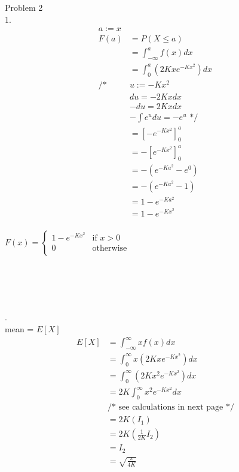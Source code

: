 \documentclass[12pt,border=4pt,multi]{article}%
\begin{document}
\\
\\
\\
\\
\newpage 
\noindent
Problem 2\\
1. 
\begin{align*}
a := x\\
F(a) &= P(X \leq a)\\
&= \int_{-\infty}^{a} f(x) dx\\
&= \int_{0}^{a} \left(2Kxe^{-Kx^2}\right) dx\\ 
\text{/* } &u := -Kx^2\\
&du = -2Kxdx\\
&-du = 2Kxdx\\ 
&-\int e^u du = -e^u \text{ */}\\
&= \left[-e^{-Kx^2}\right]_0^a\\
&= -\left[e^{-Kx^2}\right]_0^a\\
&= -\left(e^{-Ka^2} - e^0\right)\\
&= -\left(e^{-Ka^2} - 1\right)\\
&= 1 - e^{-Ka^2}\\
&=  1 - e^{-Kx^2}\\
\end{align*}
\begin{center}
$ \boxed{F(x) =
\begin{cases}
1 - e^{-Kx^2} & \text{if } x > 0\\
0 & \text{otherwise}\\
\end{cases}}$
\end{center}
\\
\\
\\
\\
\newpage
{}.\\
mean = $E[X]$
\begin{align*}
E[X] &= \int_{-\infty}^{\infty} x f(x) dx\\
&=  \int_{0}^{\infty} x \left(2Kxe^{-Kx^2}\right) dx\\
&=  \int_{0}^{\infty} \left(2Kx^2e^{-Kx^2}\right) dx\\
&=  2K\int_{0}^{\infty} x^2e^{-Kx^2} dx\\
&\text{/* see calculations in next page */}\\
&= 2K(I_1)\\
&= 2K\left(\frac{1}{2K}I_2\right)\\
&= I_2\\
&= \boxed{\sqrt{\frac{\pi}{4K}}}\\
\end{align*}
\end{document}
